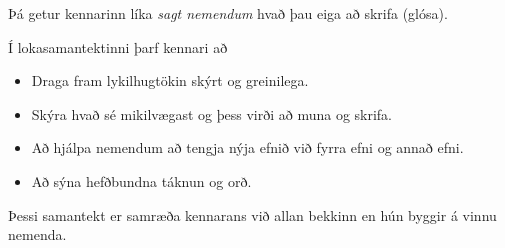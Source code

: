 \documentclass[
  icelandic,
]{book}
\providecommand{\tightlist}{%
  \setlength{\itemsep}{0pt}\setlength{\parskip}{0pt}}
\begin{document}
Þá getur kennarinn líka \emph{sagt nemendum} hvað þau eiga að skrifa (glósa).

Í lokasamantektinni þarf kennari að

\begin{itemize}
\tightlist
\item
  Draga fram lykilhugtökin skýrt og greinilega.
\item
  Skýra hvað sé mikilvægast og þess virði að muna og skrifa.
\item
  Að hjálpa nemendum að tengja nýja efnið við fyrra efni og annað efni.
\item
  Að sýna hefðbundna táknun og orð.
\end{itemize}

Þessi samantekt er samræða kennarans við allan bekkinn en hún byggir á vinnu nemenda.

\printbibliography
\end{document}
